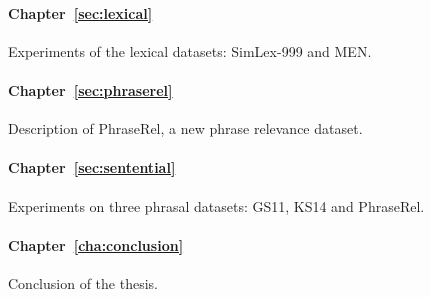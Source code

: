 \paragraph{Chapter~\ref{sec:lexical}} Experiments of the lexical datasets: SimLex-999 and MEN.

\paragraph{Chapter~\ref{sec:phraserel}} Description of PhraseRel, a new phrase relevance dataset.

\paragraph{Chapter~\ref{sec:sentential}} Experiments on three phrasal datasets: GS11, KS14 and PhraseRel.

\paragraph{Chapter~\ref{cha:conclusion}} Conclusion of the thesis.

